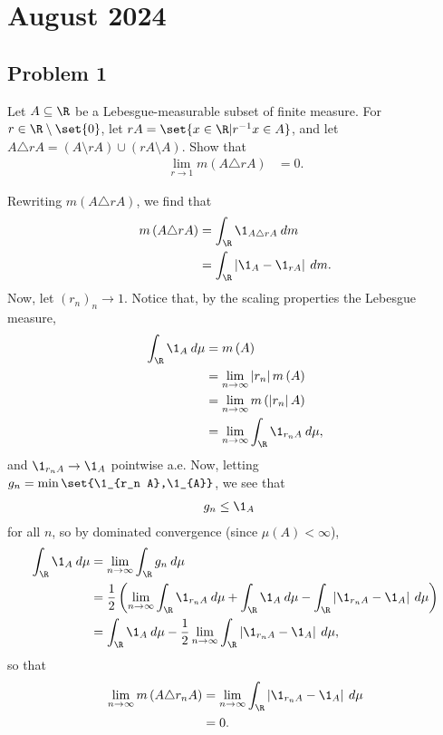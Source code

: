 \documentclass[10pt]{mypackage}
\begin{document}
\section{August 2024}%
\subsection{Problem 1}%
\begin{problem}
  Let $A\subseteq \R$ be a Lebesgue-measurable subset of finite measure. For $r\in\R\setminus \set{0}$, let $rA = \set{x\in \R | r^{-1}x\in A}$, and let $A\triangle rA = \left( A\setminus rA \right) \cup \left( rA\setminus A \right)$. Show that
  \begin{align*}
    \lim_{r\rightarrow 1} m\left( A\triangle rA \right) &= 0.
  \end{align*}
\end{problem}
Rewriting $m\left( A\triangle r A \right)$, we find that
\begin{align*}
  m\left( A\triangle r A\right)&= \int_{\R}^{} \1_{A\triangle r A}\:dm\\
                               &= \int_{\R}^{} \left\vert \1_{A} - \1_{r A} \right\vert\:dm.
\end{align*}
Now, let $\left( r_n \right)_n\rightarrow 1$. Notice that, by the scaling properties the Lebesgue measure,
\begin{align*}
  \int_{\R}^{} \1_{A}\:d\mu &= m\left( A \right)\\
                            &= \lim_{n\rightarrow\infty} \left\vert r_n \right\vert m\left( A \right)\\
                    &= \lim_{n\rightarrow\infty} m\left( \left\vert r_n \right\vert A \right)\\
                    &= \lim_{n\rightarrow\infty} \int_{\R}^{} \1_{r_n A}\:d\mu,
\end{align*}
and $\1_{r_n A}\rightarrow \1_{A}$ pointwise a.e. Now, letting $g_n = \min\set{\1_{r_n A},\1_{A}}$, we see that
\begin{align*}
  g_n &\leq \1_{A}
\end{align*}
for all $n$, so by dominated convergence (since $\mu(A) < \infty$),
\begin{align*}
  \int_{\R}^{} \1_{A}\:d\mu &= \lim_{n\rightarrow\infty} \int_{\R}^{} g_n\:d\mu\\
                            &= \frac{1}{2} \left( \lim_{n\rightarrow\infty}\int_{\R}^{} \1_{r_n A}\:d\mu + \int_{\R}^{} \1_{A}\:d\mu - \int_{\R}^{} \left\vert \1_{r_n A} - \1_{A} \right\vert\:d\mu\right)\\
                            &= \int_{\R}^{} \1_{A}\:d\mu - \frac{1}{2}\lim_{n\rightarrow\infty} \int_{\R}^{} \left\vert \1_{r_n A} - \1_{A} \right\vert\:d\mu,
\end{align*}
so that
\begin{align*}
  \lim_{n\rightarrow\infty} m\left( A\triangle r_n A \right) &= \lim_{n\rightarrow\infty} \int_{\R}^{} \left\vert \1_{r_n A} - \1_{A} \right\vert \:d\mu\\
                                   &= 0.
\end{align*}
\end{document}
